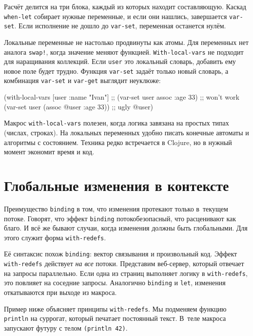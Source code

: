 Расчёт делится на три блока, каждый из которых находит составляющую. Каскад
\verb|when-let| собирает нужные переменные, и если они нашлись, завершается
\verb|var-set|. Если исполнение не дошло до \verb|var-set|, переменная
останется нулём.

Локальные переменные не настолько продвинуты как атомы. Для переменных нет
аналога \verb|swap!|, когда значение меняют функцией. \verb|With-local-vars|
не подходит для наращивания коллекций. Если \verb|user| это локальный словарь,
добавить ему новое поле будет трудно. Функция \verb|var-set| задаёт только
новый словарь, а комбинация \verb|var-set| и \verb|var-get| выглядит
неуклюже:

\begin{english}
  \begin{clojure}
(with-local-vars [user {:name "Ivan"}]
  ;; (var-set user assoc :age 33) ;; won't work
  (var-set user (assoc @user :age 33)) ;; ugly
  @user)
  \end{clojure}
\end{english}

Макрос \verb|with-local-vars| полезен, когда логика завязана на простых типах
(числах, строках). На локальных переменных удобно писать конечные автоматы и
алгоритмы с состоянием. Техника редко встречается в Clojure, но в нужный момент
экономит время и код.

\section{Глобальные изменения в контексте}


\label{with-redefs}

Преимущество \verb|binding| в том, что изменения протекают только в~текущем
потоке. Говорят, что эффект \verb|binding| потокобезопасный, что расценивают
как благо. И всё же бывают случаи, когда изменения должны быть глобальными. Для
этого служит форма \verb|with-redefs|.

Её синтаксис похож \verb|binding|: вектор связывания и произвольный
код. Эффект \verb|with-redefs| действует \emph{на все} потоки. Представим
веб-сервер, который отвечает на запросы параллельно. Если одна из страниц
выполняет логику в \verb|with-redefs|, это повлияет на соседние
запросы. Аналогично \verb|binding| и \verb|let|, изменения откатываются при
выходе из макроса.

Пример ниже объясняет принципы \verb|with-redefs|. Мы подменяем функцию
\verb|println| на суррогат, который печатает постоянный текст. В~теле макроса
запускают футуру с телом \verb|(println 42)|.


